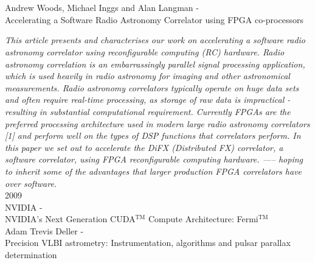 \hfill\\\\
{\large Andrew Woods,
Michael Inggs and Alan Langman - \hfill \\ Accelerating a Software Radio Astronomy
Correlator using FPGA co-processors }

\textit{This article presents and characterises our work on
accelerating a software radio astronomy correlator
using reconfigurable computing (RC) hardware. Radio
astronomy correlation is an embarrassingly parallel signal
processing application, which is used heavily in
radio astronomy for imaging and other astronomical
measurements. Radio astronomy correlators typically
operate on huge data sets and often require real-time
processing, as storage of raw data is impractical - resulting
in substantial computational requirement. Currently
FPGAs are the preferred processing architecture used in
modern large radio astronomy correlators [1] and perform
well on the types of DSP functions that correlators
perform.
In this paper we set out to accelerate the DiFX
(Distributed FX) correlator, a software correlator, using
FPGA reconfigurable computing hardware. —– hoping
to inherit some of the advantages that larger production
FPGA correlators have over software.}\\

\noindent
{\large 2009}\\
\noindent
{\large NVIDIA - \hfill \\
NVIDIA’s Next Generation
CUDA$^{\textrm{TM}}$ Compute Architecture: Fermi$^{\textrm{TM}}$}\\
\noindent
{\large Adam Trevis Deller - \hfill \\ Precision VLBI astrometry: Instrumentation, algorithms and pulsar  parallax determination}

